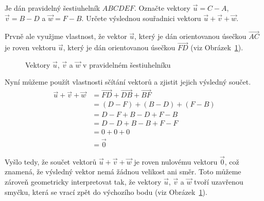 \begin{example}
    Je dán pravidelný šestiuhelník $ABCDEF$. Označte vektory $\vec{u} = C - A$, $\vec{v} = B - D$ a $\vec{w} = F - B$. 
    Určete výslednou souřadnici vektoru $\vec{u} + \vec{v} + \vec{w}$.
    
    Prvně ale využjme vlastnost, že vektor $\vec{u}$, který je dán orientovanou úsečkou $\overrightarrow{AC}$ je roven vektoru $\vec{u}$, který je dán orientovanou úsečkou $\overrightarrow{FD}$ (viz Obrázek~\ref{fig:vector_operations_hexagon}).
    
    \begin{figure}[H]
        \centering
        \caption{Vektory $\vec{u}$, $\vec{v}$ a $\vec{w}$ v pravidelném šestiuhelníku}
        \label{fig:vector_operations_hexagon}
    \end{figure}

    Nyní můžeme použít vlastnosti sčítání vektorů a zjistit jejich výsledný součet.
    \begin{align*}
        \vec{u} + \vec{v} + \vec{w} &= \overrightarrow{FD} + \overrightarrow{DB} + \overrightarrow{BF} \\
                                    &= (D - F) + (B - D) + (F - B) \\
                                    &= D - F + B - D + F - B \\
                                    &= D - D + B - B + F - F \\
                                    &= 0 + 0 + 0 \\
                                    &= \vec{0}
    \end{align*}
   
    Vyšlo tedy, že součet vektorů $\vec{u} + \vec{v} + \vec{w}$ je roven nulovému vektoru $\vec{0}$, což znamená, že výsledný vektor nemá žádnou velikost ani směr.
    Toto můžeme zároveň geometricky interpretovat tak, že vektory $\vec{u}$, $\vec{v}$ a $\vec{w}$ tvoří uzavřenou smyčku, která se vrací zpět do výchozího bodu (viz Obrázek~\ref{fig:vector_operations_hexagon}).
\end{example}



